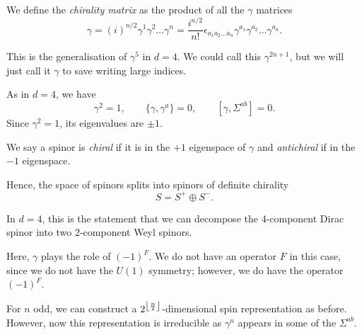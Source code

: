 \begin{definition}
  We define the \emph{chirality matrix} as the product of all the $\gamma$  matrices
  \begin{equation}
    \gamma = (i)^{n / 2} \gamma^1 \gamma^2 \dots \gamma^{n} = \frac{i^{n / 2}}{n!} \epsilon_{a_1 a_2 \dots a_n} \gamma^{a_1} \gamma^{a_2} \dots \gamma^{a_n}.
  \end{equation}
\end{definition}
\begin{remark}
  This is the generalisation of $\gamma^5$ in $d = 4$. We could call this $\gamma^{2n+1}$, but we will just call it $\gamma$ to save writing large indices.
\end{remark}
As in $d = 4$, we have
 \begin{equation}
  \gamma^2 = 1, \qquad \{\gamma, \gamma^{a}\} = 0, \qquad [\gamma, \Sigma^{ab}] = 0.
\end{equation}
Since $\gamma^2 = 1$, its eigenvalues are  $\pm 1$.
\begin{definition}[]
  We say a spinor is \emph{chiral} if it is in the $+1$ eigenspace of $\gamma$ and \emph{antichiral} if in the $-1$ eigenspace.
\end{definition}
Hence, the space of spinors splits into spinors of definite chirality
\begin{equation}
  S = S^+ \oplus S^-.
\end{equation}
\begin{remark}
  In $d = 4$, this is the statement that we can decompose the $4$-component Dirac spinor into two $2$-component Weyl spinors.
\end{remark}
Here, $\gamma$ plays the role of $(-1)^F$.
We do not have an operator $F$ in this case, since we do not have the $U(1)$ symmetry; however, we do have the operator $(-1)^F$.
\begin{remark}
  For $n$ odd, we can construct a $2^{\floor*{\frac{n}{2}}}$-dimensional spin representation as before.
  However, now this representation is irreducible as $\gamma^n$ appears in some of the $\Sigma^{ab}$.
\end{remark}

